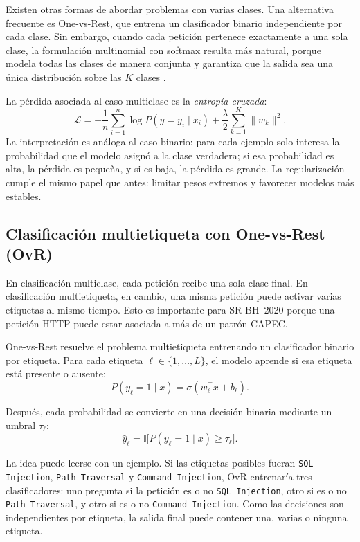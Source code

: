 \documentclass[12pt,oneside]{report}
\newcommand{\ind}{\mathbb{I}} %
\begin{document}
Existen otras formas de abordar problemas con varias clases. Una alternativa
frecuente es One-vs-Rest, que entrena un clasificador binario independiente
por cada clase. Sin embargo, cuando cada petición pertenece exactamente a
una sola clase, la formulación multinomial con softmax resulta más natural,
porque modela todas las clases de manera conjunta y garantiza que la salida
sea una única distribución sobre las $K$ clases
\cite{sklearn_logreg,islr_logreg}.

La pérdida asociada al caso multiclase es la \textit{entropía cruzada}:
\[
\mathcal{L}=
-\frac{1}{n}\sum_{i=1}^{n}\log P(y=y_i\mid x_i)
+ \frac{\lambda}{2}\sum_{k=1}^{K}\lVert w_k\rVert^2.
\]
La interpretación es análoga al caso binario: para cada ejemplo solo
interesa la probabilidad que el modelo asignó a la clase verdadera; si esa
probabilidad es alta, la pérdida es pequeña, y si es baja, la pérdida es
grande. La regularización cumple el mismo papel que antes: limitar pesos
extremos y favorecer modelos más estables.

\subsection{Clasificación multietiqueta con One-vs-Rest (OvR)}

En clasificación multiclase, cada petición recibe una sola clase final. En clasificación multietiqueta, en cambio, una misma petición puede activar varias etiquetas al mismo tiempo. Esto es importante para SR-BH~2020 porque una petición HTTP puede estar asociada a más de un patrón CAPEC.

One-vs-Rest resuelve el problema multietiqueta entrenando un clasificador binario por etiqueta. Para cada etiqueta $\ell\in\{1,\dots,L\}$, el modelo aprende si esa etiqueta está presente o ausente:
\[
P(y_\ell=1\mid x)=\sigma(w_\ell^\top x+b_\ell).
\]

Después, cada probabilidad se convierte en una decisión binaria mediante un umbral $\tau_\ell$:
\[
\hat{y}_{\ell}=\ind\big[P(y_\ell=1\mid x)\ge \tau_\ell\big].
\]

La idea puede leerse con un ejemplo. Si las etiquetas posibles fueran \texttt{SQL Injection}, \texttt{Path Traversal} y \texttt{Command Injection}, OvR entrenaría tres clasificadores: uno pregunta si la petición es o no \texttt{SQL Injection}, otro si es o no \texttt{Path Traversal}, y otro si es o no \texttt{Command Injection}. Como las decisiones son independientes por etiqueta, la salida final puede contener una, varias o ninguna etiqueta.
\end{document}
